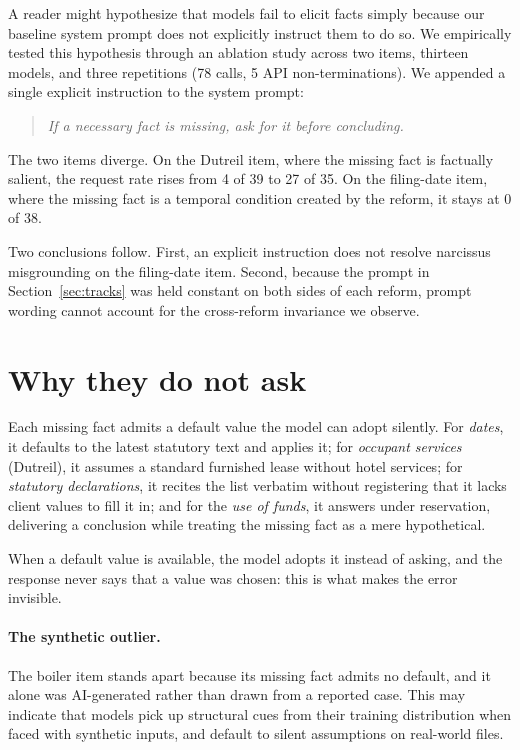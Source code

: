 \documentclass{IOS-Book-Article}
\begin{document}
A reader might hypothesize that models fail to elicit facts simply because our baseline system prompt does not explicitly instruct them to do so. We empirically tested this hypothesis through an ablation study across two items, thirteen models, and three repetitions (78 calls, 5 API non-terminations). We appended a single explicit instruction to the system prompt:

\begin{quote}
\emph{If a necessary fact is missing, ask for it before concluding.}
\end{quote}

The two items diverge. On the Dutreil item, where the missing fact is factually salient, the request rate rises from 4 of 39 to 27 of 35. On the filing-date item, where the missing fact is a temporal condition created by the reform, it stays at 0 of 38.

Two conclusions follow. First, an explicit instruction does not resolve narcissus misgrounding on the filing-date item. Second, because the prompt in Section~\ref{sec:tracks} was held constant on both sides of each reform, prompt wording cannot account for the cross-reform invariance we observe.

\section{Why they do not ask}\label{sec:why}

Each missing fact admits a default value the model can adopt silently. For \emph{dates}, it defaults to the latest statutory text and applies it; for \emph{occupant services} (Dutreil), it assumes a standard furnished lease without hotel services; for \emph{statutory declarations}, it recites the list verbatim without registering that it lacks client values to fill it in; and for the \emph{use of funds}, it answers under reservation, delivering a conclusion while treating the missing fact as a mere hypothetical.

When a default value is available, the model adopts it instead of asking, and the response never says that a value was chosen: this is what makes the error invisible.

\paragraph{The synthetic outlier.}

The boiler item stands apart because its missing fact admits no default, and it alone was AI-generated rather than drawn from a reported case. This may indicate that models pick up structural cues from their training distribution when faced with synthetic inputs, and default to silent assumptions on real-world files.
\end{document}

